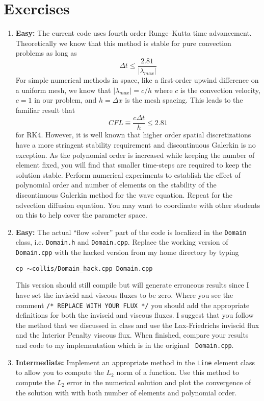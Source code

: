 \documentclass[11pt]{article}
\begin{document}
\section*{\normalsize\bf Exercises}
\begin{enumerate}

\item {\bf Easy:} The current code uses fourth order Runge--Kutta time
advancement.  Theoretically we know that this method is stable for pure
convection problems as long as
\[ \Delta t \le \frac{2.81}{|\lambda_{max}|} \]
For simple numerical methods in space, like a first-order upwind difference on
a uniform mesh, we know that $|\lambda_{max}| = c/h$ where $c$ is the
convection velocity, $c=1$ in our problem, and $h = \Delta x$ is the mesh
spacing.  This leads to the familiar result that
\[ CFL \equiv \frac{c \Delta t}{h} \le 2.81 \]
for RK4.  However, it is well known that higher order spatial discretizations
have a more stringent stability requirement and discontinuous Galerkin is no
exception.  As the polynomial order is increased while keeping the number of
element fixed, you will find that smaller time-steps are required to keep the
solution stable.  Perform numerical experiments to establish the effect of
polynomial order and number of elements on the stability of the discontinuous
Galerkin method for the wave equation.  Repeat for the advection diffusion
equation.  You may want to coordinate with other students on this to help
cover the parameter space.

\item {\bf Easy:} The actual ``flow solver'' part of the code is
localized in the {\tt Domain} class, i.e. {\tt Domain.h} and {\tt Domain.cpp}.
Replace the working version of {\tt Domain.cpp} with the hacked version from
my home directory by typing
\begin{center}
{\tt cp $\sim$collis/Domain\_hack.cpp Domain.cpp}
\end{center}
This version should still compile but will generate erroneous results since I
have set the inviscid and viscous fluxes to be zero.  Where you see the
comment {\tt /* REPLACE WITH YOUR FLUX */} you should add the appropriate
definitions for both the inviscid and viscous fluxes.  I suggest that you
follow the method that we discussed in class and use the Lax-Friedrichs
inviscid flux and the Interior Penalty viscous flux.  When finished, compare
your results and code to my implementation which is in the original {\tt
Domain.cpp}.

\item {\bf Intermediate:} Implement an appropriate method in the {\tt Line}
element class to allow you to compute the $L_2$ norm of a function.  Use this
method to compute the $L_2$ error in the numerical solution and plot the
convergence of the solution with with both number of elements and polynomial
order.


\end{enumerate}
\end{document}

